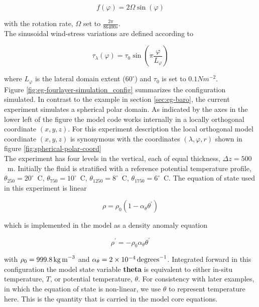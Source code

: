 \begin{equation}
\label{eq:eg-fourlayer-fcori}
f(\varphi) = 2 \Omega \sin( \varphi )
\end{equation}
 
\noindent with the rotation rate, $\Omega$ set to $\frac{2 \pi}{86400s}$.
\\
  
 The sinusoidal wind-stress variations are defined according to 

\begin{equation}
\label{eq:taux}
\tau_{\lambda}(\varphi) = \tau_{0}\sin(\pi \frac{\varphi}{L_{\varphi}})
\end{equation}
 
\noindent where $L_{\varphi}$ is the lateral domain extent ($60^{\circ}$) and 
$\tau_0$ is set to $0.1N m^{-2}$. 
\\

Figure \ref{fig:eg-fourlayer-simulation_config}
summarizes the configuration simulated.
In contrast to the example in section \ref{sec:eg-baro}, the 
current experiment simulates a spherical polar domain. As indicated
by the axes in the lower left of the figure the model code works internally
in a locally orthogonal coordinate $(x,y,z)$. For this experiment description 
the local orthogonal model coordinate $(x,y,z)$ is synonymous 
with the coordinates $(\lambda,\varphi,r)$ shown in figure
\ref{fig:spherical-polar-coord}
\\

The experiment has four levels in the vertical, each of equal thickness,
$\Delta z = 500$~m. Initially the fluid is stratified with a reference
potential temperature profile,
$\theta_{250}=20^{\circ}$~C,
$\theta_{750}=10^{\circ}$~C,
$\theta_{1250}=8^{\circ}$~C,
$\theta_{1750}=6^{\circ}$~C. The equation of state used in this experiment is 
linear

\begin{equation}
\label{eq:eg-fourlayer-linear1_eos}
\rho = \rho_{0} ( 1 - \alpha_{\theta}\theta^{'} )
\end{equation}

\noindent which is implemented in the model as a density anomaly equation

\begin{equation}
\label{eq:eg-fourlayer-linear1_eos_pert}
\rho^{'} = -\rho_{0}\alpha_{\theta}\theta^{'}
\end{equation}

\noindent with $\rho_{0}=999.8\,{\rm kg\,m}^{-3}$ and 
$\alpha_{\theta}=2\times10^{-4}\,{\rm degrees}^{-1} $. Integrated forward in
this configuration the model state variable {\bf theta} is equivalent to
either in-situ temperature, $T$, or potential temperature, $\theta$. For 
consistency with later examples, in which the equation of state is
non-linear, we use $\theta$ to represent temperature here. This is
the quantity that is carried in the model core equations.

